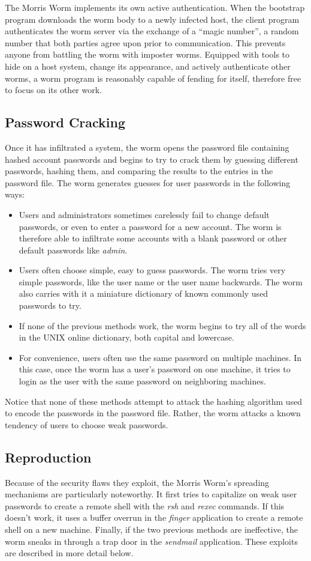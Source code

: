 The Morris Worm implements its own active authentication.
When the bootstrap program downloads the worm body to a newly infected host, the client
program authenticates the worm server via the exchange of a ``magic number'', a
random number that both parties agree upon prior to communication. 
This prevents anyone from battling the worm with imposter worms. Equipped with
tools to hide on a host system, change its appearance, and actively authenticate
other worms, a worm program is reasonably capable of fending for itself,
therefore free to focus on its other work.

\subsection*{Password Cracking}
Once it has infiltrated a system, the worm opens the password file
containing hashed account passwords and begins to try to crack them by guessing
different passwords, hashing them, and comparing the results to the entries in
the password file. The worm generates guesses for user passwords in the
following ways:

\begin{itemize}
\item Users and administrators sometimes carelessly fail to change
default passwords, or even to enter a password for a new account. The worm is
therefore able to infiltrate some accounts with a blank password or other
default passwords like \textit{admin}.
\item Users often choose simple, easy to
guess passwords. The worm tries very simple passwords, like the user name or the
user name backwards. The worm also carries with it a miniature dictionary of
known commonly used passwords to try. 
\item If none of the previous methods work, the worm begins to try all
of the words in the UNIX online dictionary, both capital and lowercase.
\item For convenience, users often use the same password on multiple
machines. In this case, once the worm has a user's password on one
machine, it tries to login as the user with the same password on neighboring
machines.
\end{itemize}

Notice that none of these methods attempt to attack the hashing algorithm used
to encode the passwords in the password file. Rather, the worm attacks a known
tendency of users to choose weak passwords.


\subsection*{Reproduction}
Because of the security flaws they exploit, the Morris Worm's spreading
mechanisms are particularly noteworthy. It first tries to capitalize on weak
user passwords to create a remote shell with the \textit{rsh} and \textit{rexec}
commands.
If this doesn't work, it uses a buffer overrun in the \textit{finger}
application to create a remote shell on a new machine. Finally, if the two
previous methods are ineffective, the worm sneaks in through a trap door in the
\textit{sendmail} application. These exploits are described in more detail
below.
